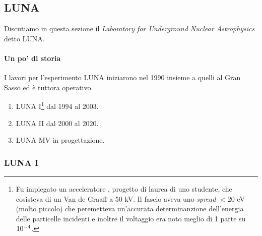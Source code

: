 \subsection{LUNA}\label{sec-LUNA}
Discutiamo in questa sezione il \textit{Laboratory for Underground Nuclear Astrophysics} detto LUNA.

\paragraph{Un po' di storia} 
I lavori per l'esperimento LUNA iniziarono nel 1990 insieme a quelli al Gran Sasso ed è tuttora operativo.
\begin{enumerate}
	\item LUNA I\footnote{Fu impiegato un acceleratore \textit{}, progetto di laurea di uno studente, che cosisteva di un Van de Graaff a 50 kV. Il fascio aveva uno \textit{spread} $<20$ eV (molto piccolo) che peremetteva un'accurata determinanzione dell'energia delle particelle incidenti e inoltre il voltaggio era noto meglio di 1 parte su $10^{-4}$.} dal 1994 al 2003.
	\item LUNA II dal 2000 al 2020.
	\item LUNA MV in progettazione.
\end{enumerate}

\subsubsection{LUNA I}\label{sec-LUNA-I}
